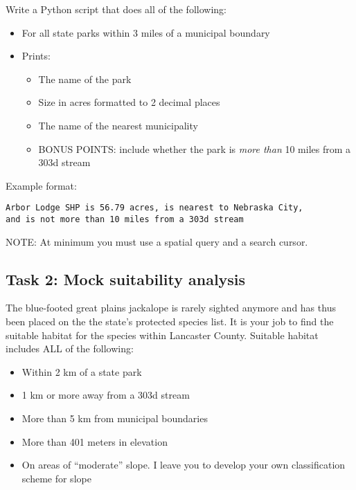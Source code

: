\documentclass[]{article}
\providecommand{\tightlist}{%
  \setlength{\itemsep}{0pt}\setlength{\parskip}{0pt}}
\begin{document}
Write a Python script that does all of the following:

\begin{itemize}
\tightlist
\item
  For all state parks within 3 miles of a municipal boundary
\item
  Prints:

  \begin{itemize}
  \tightlist
  \item
    The name of the park
  \item
    Size in acres formatted to 2 decimal places
  \item
    The name of the nearest municipality
  \item
    BONUS POINTS: include whether the park is \emph{more than} 10 miles
    from a 303d stream
  \end{itemize}
\end{itemize}

Example format:

\begin{verbatim}
Arbor Lodge SHP is 56.79 acres, is nearest to Nebraska City, 
and is not more than 10 miles from a 303d stream
\end{verbatim}

NOTE: At minimum you must use a spatial query and a search cursor.

\hypertarget{task-2-mock-suitability-analysis}{%
\subsection{Task 2: Mock suitability
analysis}\label{task-2-mock-suitability-analysis}}

The blue-footed great plains jackalope is rarely sighted anymore and has
thus been placed on the the state's protected species list. It is your
job to find the suitable habitat for the species within Lancaster
County. Suitable habitat includes ALL of the following:

\begin{itemize}
\tightlist
\item
  Within 2 km of a state park
\item
  1 km or more away from a 303d stream
\item
  More than 5 km from municipal boundaries
\item
  More than 401 meters in elevation
\item
  On areas of ``moderate'' slope. I leave you to develop your own
  classification scheme for slope
\end{itemize}
\end{document}
